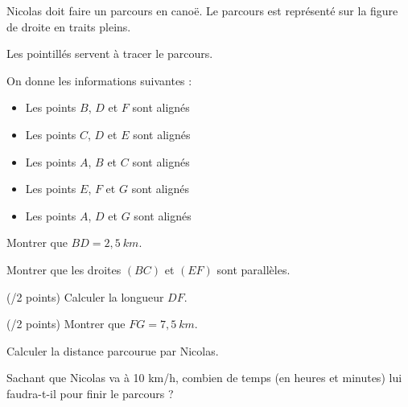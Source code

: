 \begin{minipage}[t]{0.45\textwidth}
    Nicolas doit faire un parcours en canoë. Le parcours est représenté sur la figure de droite en traits pleins.
    
    Les pointillés servent à tracer le parcours.

    On donne les informations suivantes :
    \begin{itemize}
        \item Les points $B$, $D$ et $F$ sont alignés
        \item Les points $C$, $D$ et $E$ sont alignés
        \item Les points $A$, $B$ et $C$ sont alignés
        \item Les points $E$, $F$ et $G$ sont alignés
        \item Les points $A$, $D$ et $G$ sont alignés
    \end{itemize}
    \vspace{1em}

    \cnt Montrer que $BD=2,5~km$.

    \cnt Montrer que les droites $(BC)$ et $(EF)$ sont parallèles.

    \cnt (/2 points) Calculer la longueur $DF$.

    \cnt (/2 points) Montrer que $FG=7,5~km$.

    \cnt Calculer la distance parcourue par Nicolas.

    \cnt Sachant que Nicolas va à 10 km/h, combien de temps (en heures et minutes) lui faudra-t-il pour finir le parcours ? 
\end{minipage}
\hfill
